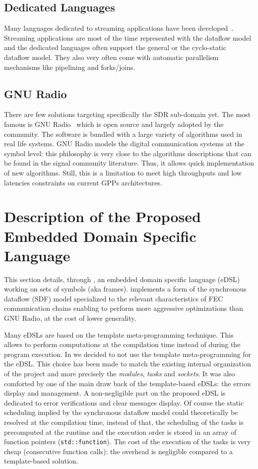 \subsection{Dedicated Languages}

Many languages dedicated to streaming applications have been
developed~\cite{Buck2004,Amarasinghe2005,Liao2006,Black-Schaffer2010,Glitia2010,
Thies2010,DeOliveiraCastro2017}. Streaming applications are most of the time
represented with the dataflow model and the dedicated languages often support
the general or the cyclo-static dataflow model. They also very often come with
automatic parallelism mechanisms like pipelining and forks/joins.

\subsection{GNU Radio}

There are few solutions targeting specifically the SDR sub-domain yet. The most
famous is GNU Radio~\cite{GNURadio} which is open source and largely adopted by
the community. The software is bundled with a large variety of algorithms used
in real life systems. GNU Radio models the digital communication systems at the
symbol level: this philosophy is very close to the algorithms descriptions that
can be found in the signal community literature. Thus, it allows quick
implementation of new algorithms. Still, this is a limitation to meet high
throughputs and low latencies constraints on current GPPs architectures.

\section{Description of the Proposed Embedded Domain Specific Language}

This section details, through \AFFECT, an embedded domain specific language
(eDSL) working on sets of symbols (aka frames). \AFFECT implements a form of the
synchronous dataflow (SDF) model specialized to the relevant characteristics of
FEC communication chains enabling to perform more aggressive optimizations than
GNU Radio, at the cost of lower generality.

Many \Cxx eDSLs are based on the template meta-programming technique. This
allows to perform computations at the compilation time instead of during the
program execution. In \AFFECT we decided to not use the \Cxx template
meta-programming for the eDSL. This choice has been made to match the existing
internal organization of the project and more precisely the \emph{modules},
\emph{tasks} and \emph{sockets}. It was also comforted by one of the main draw
back of the template-based eDSLs: the errors display and management. A
non-negligible part on the proposed eDSL is dedicated to error verifications and
clear messages display. Of course the static scheduling implied by the
synchronous dataflow model could theoretically be resolved at the compilation
time, instead of that, the scheduling of the tasks is precomputed at the
runtime and the execution order is stored in an array of function pointers
(\verb|std::function|). The cost of the execution of the tasks is very cheap
(consecutive function calls): the overhead is negligible compared to a
template-based solution.

